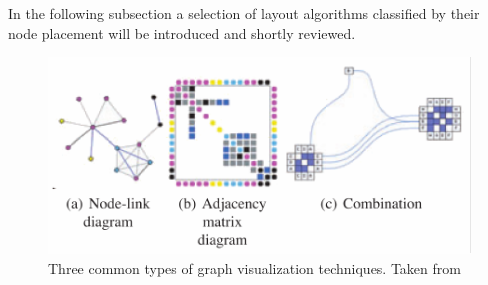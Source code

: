 In the following subsection a selection of layout algorithms classified by their node placement will be introduced and shortly reviewed.
\begin{figure}
    \centering
    \includegraphics[width=\linewidth]{media/vis_types.pdf}
    \caption{Three common types of graph visualization techniques. Taken from \cite{VonLandesberger2011}}
    \label{fig:vis_types}
\end{figure}


